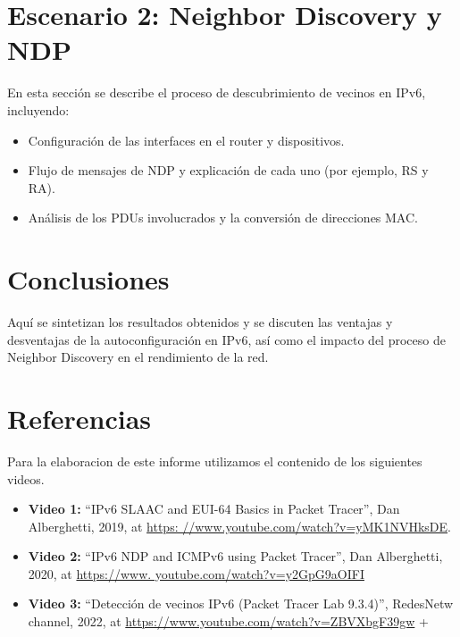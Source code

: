 \documentclass[a4paper,12pt]{article}
\begin{document}
\section{Escenario 2: Neighbor Discovery y NDP}
En esta sección se describe el proceso de descubrimiento de vecinos en IPv6, incluyendo:
\begin{itemize}
  \item Configuración de las interfaces en el router y dispositivos.
  \item Flujo de mensajes de NDP y explicación de cada uno (por ejemplo, RS y RA).
  \item Análisis de los PDUs involucrados y la conversión de direcciones MAC.
\end{itemize}

\section{Conclusiones}
Aquí se sintetizan los resultados obtenidos y se discuten las ventajas y desventajas de la autoconfiguración en IPv6, así como el impacto del proceso de Neighbor Discovery en el rendimiento de la red.

\section{Referencias}
Para la elaboracion de este informe utilizamos el contenido de los siguientes videos. 
\begin{itemize}
  \item \textbf{Video 1:} “IPv6 SLAAC and EUI-64 Basics in Packet Tracer”, Dan Alberghetti, 2019, at \url{https:
  //www.youtube.com/watch?v=yMK1NVHksDE}.
  \item \textbf{Video 2:} “IPv6 NDP and ICMPv6 using Packet Tracer”, Dan Alberghetti, 2020, at \url{https://www.
  youtube.com/watch?v=y2GpG9aOIFI}
  \item \textbf{Video 3:} “Detección de vecinos IPv6 (Packet Tracer Lab 9.3.4)”, RedesNetw channel, 2022, at \url{https://www.youtube.com/watch?v=ZBVXbgF39gw}
+\end{itemize}
\end{document}
